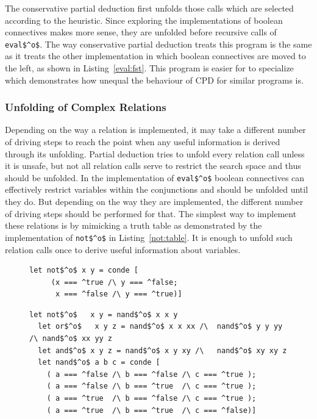 The conservative partial deduction first unfolds those calls which are selected according to the heuristic.
Since exploring the implementations of boolean connectives makes more sense, they are unfolded before recursive calls of \lstinline{eval$^o$}.
The way conservative partial deduction treats this program is the same as it treats the other implementation in which boolean connectives
are moved to the left, as shown in Listing~\ref{eval:fst}.
This program is easier for \ecce to specialize which demonstrates how unequal the behaviour of CPD for similar programs is.

\subsubsection{Unfolding of Complex Relations}

Depending on the way a relation is implemented, it may take a different number of driving steps to reach the point when any useful information is derived through its unfolding.
Partial deduction tries to unfold every relation call unless it is unsafe, but not all relation calls serve to restrict the search space and thus should be unfolded.
In the implementation of \lstinline{eval$^o$} boolean connectives can effectively restrict variables within the conjunctions and should be unfolded until they do.
But depending on the way they are implemented, the different number of driving steps should be performed for that.
The simplest way to implement these relations is by mimicking a truth table as demonstrated by the implementation of \lstinline{not$^o$} in Listing~\ref{not:table}.
It is enough to unfold such relation calls once to derive useful information about variables.

\begin{figure}[!t]
  \centering
  \begin{minipage}{0.5\textwidth}
    \begin{lstlisting}[label={not:table}, caption={Implementation of boolean \lstinline{not} as a table}, captionpos=b, frame=tb]
  let not$^o$ x y = conde [
     (x === ^true /\ y === ^false;
      x === ^false /\ y === ^true)]
    \end{lstlisting}
  \end{minipage}
  \begin{minipage}{0.8\textwidth}
    \begin{lstlisting}[label={not:nando}, caption={Implementation of boolean operations via \lstinline{nand}}, captionpos=b, frame=tb]
  let not$^o$   x y = nand$^o$ x x y
  let or$^o$   x y z = nand$^o$ x x xx /\  nand$^o$ y y yy /\ nand$^o$ xx yy z
  let and$^o$ x y z = nand$^o$ x y xy /\   nand$^o$ xy xy z
  let nand$^o$ a b c = conde [
    ( a === ^false /\ b === ^false /\ c === ^true );
    ( a === ^false /\ b === ^true  /\ c === ^true );
    ( a === ^true  /\ b === ^false /\ c === ^true );
    ( a === ^true  /\ b === ^true  /\ c === ^false)]
    \end{lstlisting}
  \end{minipage}
\end{figure}

